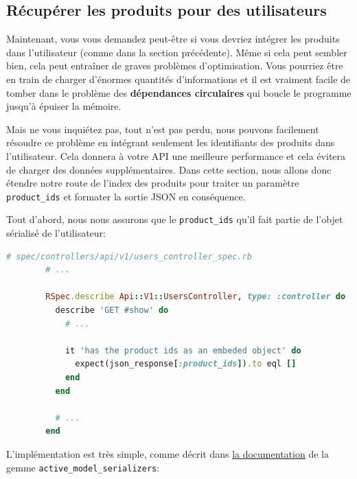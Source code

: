 \documentclass[]{report}
\begin{document}
    \subsection{Récupérer les produits pour des utilisateurs}

      Maintenant, vous vous demandez peut-être si vous devriez intégrer les produits dans l'utilisateur (comme dans la section précédente). Même si cela peut sembler bien, cela peut entraîner de graves problèmes d'optimisation. Vous pourriez être en train de charger d'énormes quantités d'informations et il est vraiment facile de tomber dans le problème des \textbf{dépendances circulaires} qui boucle le programme jusqu'à épuiser la mémoire.

      Mais ne vous inquiétez pas, tout n'est pas perdu, nous pouvons facilement résoudre ce problème en intégrant seulement les identifiants des produits dans l'utilisateur. Cela donnera à votre API une meilleure performance et cela évitera de charger des données supplémentaires. Dans cette section, nous allons donc étendre notre route de l'index des produits pour traiter un paramètre \verb|product_ids| et formater la sortie JSON en conséquence.

      Tout d'abord, nous nous assurons que le \verb|product_ids| qu'il fait partie de l'objet sérialisé de l'utilisateur:

      \begin{scriptsize}
        \begin{lstlisting}[language=ruby, caption={Test de présence des identifiants des produits dans l'objet de l'utilisateur}, label={lst:product_ids_users_controller_spec}]
        # spec/controllers/api/v1/users_controller_spec.rb
        # ...

        RSpec.describe Api::V1::UsersController, type: :controller do
          describe 'GET #show' do
            # ...

            it 'has the product ids as an embeded object' do
              expect(json_response[:product_ids]).to eql []
            end
          end

          # ...
        end
        \end{lstlisting}
      \end{scriptsize}

      L'implémentation est très simple, comme décrit dans \href{https://github.com/rails-api/active_model_serializers/blob/0-10-stable/docs/howto/add_relationship_links.md#links-as-an-attribute-of-a-resource}{la documentation} de la gemme \verb|active_model_serializers|:
\end{document}

